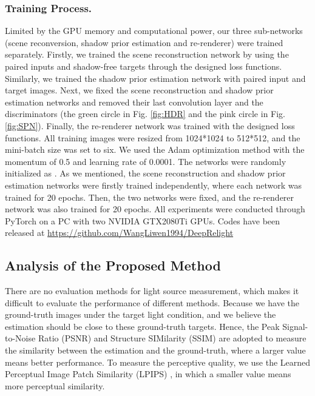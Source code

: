 \documentclass[runningheads]{llncs}
\begin{document}
\subsubsection{Training Process.} Limited by the GPU memory and computational power, our three sub-networks (scene reconversion, shadow prior estimation and re-renderer) were trained separately. Firstly, we trained the scene reconstruction network by using the paired inputs and shadow-free targets through the designed loss functions. Similarly, we trained the shadow prior estimation network with paired input and target images. Next, we fixed the scene reconstruction and shadow prior estimation networks and removed their last convolution layer and the discriminators (the green circle in Fig. \ref{fig:HDR} and the pink circle in Fig. \ref{fig:SPN}). Finally, the re-renderer network was trained with the designed loss functions. All training images were resized from 1024*1024 to 512*512, and the mini-batch size was set to six. We used the Adam optimization method with the momentum of 0.5 and learning rate of 0.0001. The networks were randomly initialized as \cite{pix2pixHD}. As we mentioned, the scene reconstruction and shadow prior estimation networks were firstly trained independently, where each network was trained for 20 epochs. Then, the two networks were fixed, and the re-renderer network was also trained for 20 epochs. All experiments were conducted through PyTorch \cite{pytorch} on a PC with two NVIDIA GTX2080Ti GPUs. Codes have been released at {\color{blue} \url{https://github.com/WangLiwen1994/DeepRelight}}

\baselineskip 
\subsection{Analysis of the Proposed Method}
\baselineskip 
There are no evaluation methods for light source measurement, which makes it difficult to evaluate the performance of different methods. Because we have the ground-truth images under the target light condition, and we believe the estimation should be close to these ground-truth targets. Hence, the Peak Signal-to-Noise Ratio (PSNR) and Structure SIMilarity (SSIM) \cite{SSIM} are adopted to measure the similarity between the estimation and the ground-truth, where a larger value means better performance. To measure the perceptive quality, we use the Learned Perceptual Image Patch Similarity (LPIPS) \cite{LPIPS}, in which a smaller value means more perceptual similarity. 
\end{document}
